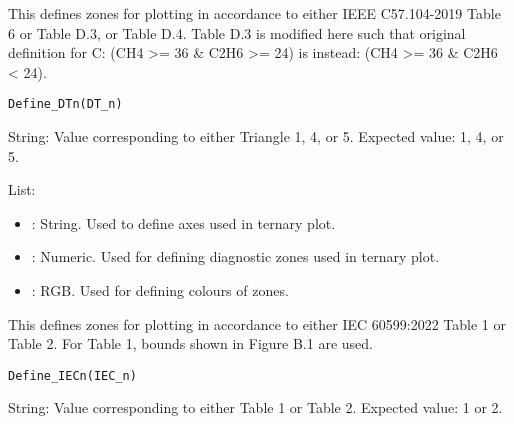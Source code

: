 \documentclass[a4paper]{book}
\begin{document}
%
\begin{Description}
This defines zones for plotting in accordance to either IEEE C57.104-2019 Table 6 or Table D.3, or Table D.4. Table D.3 is modified here such that original definition for C: (CH4 >= 36 \& C2H6 >= 24) is instead: (CH4 >= 36 \& C2H6 < 24).
\end{Description}
%
\begin{Usage}
\begin{verbatim}
Define_DTn(DT_n)
\end{verbatim}
\end{Usage}
%
\begin{Arguments}
\begin{ldescription}
\item[\code{DT\_n}] String: Value corresponding to either Triangle 1, 4, or 5. Expected value: 1, 4, or 5.
\end{ldescription}
\end{Arguments}
%
\begin{Value}
List:
\begin{itemize}

\item{} : String. Used to define axes used in ternary plot.
\item{} : Numeric. Used for defining diagnostic zones used in ternary plot.
\item{} : RGB. Used for defining colours of zones.

\end{itemize}

\end{Value}
%
\begin{Description}
This defines zones for plotting in accordance to either IEC 60599:2022 Table 1 or Table 2. For Table 1, bounds shown in Figure B.1 are used.
\end{Description}
%
\begin{Usage}
\begin{verbatim}
Define_IECn(IEC_n)
\end{verbatim}
\end{Usage}
%
\begin{Arguments}
\begin{ldescription}
\item[\code{IEC\_n}] String: Value corresponding to either Table 1 or Table 2. Expected value: 1 or 2.
\end{ldescription}
\end{Arguments}
\end{document}
